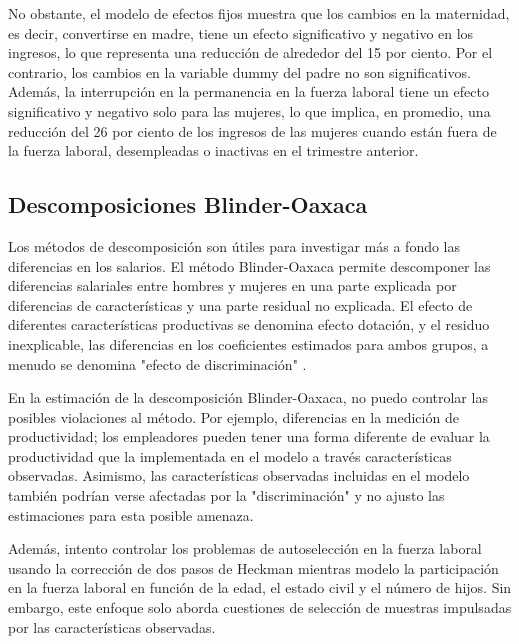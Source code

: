No obstante, el modelo de efectos fijos muestra que los cambios en la maternidad, es decir, convertirse en madre, tiene un efecto significativo y negativo en los ingresos, lo que representa una reducción de alrededor del 15 por ciento. Por el contrario, los cambios en la variable dummy del padre no son significativos. Además, la interrupción en la permanencia en la fuerza laboral tiene un efecto significativo y negativo solo para las mujeres, lo que implica, en promedio, una reducción del 26 por ciento de los ingresos de las mujeres cuando están fuera de la fuerza laboral, desempleadas o inactivas en el trimestre anterior.
\subsection{Descomposiciones Blinder-Oaxaca}
Los métodos de descomposición son útiles para investigar más a fondo las diferencias en los salarios. El método Blinder-Oaxaca permite descomponer las diferencias salariales entre hombres y mujeres en una parte explicada por diferencias de características y una parte residual no explicada. El efecto de diferentes características productivas se denomina efecto dotación, y el residuo inexplicable, las diferencias en los coeficientes estimados para ambos grupos, a menudo se denomina "efecto de discriminación" \citep{Weichselbaumer2005}.

En la estimación de la descomposición Blinder-Oaxaca, no puedo controlar las posibles violaciones al método. Por ejemplo, diferencias en la medición de productividad; los empleadores pueden tener una forma diferente de evaluar la productividad que la implementada en el modelo a través características observadas. Asimismo, las características observadas incluidas en el modelo también podrían verse afectadas por la "discriminación" y no ajusto las estimaciones para esta posible amenaza.

Además, intento controlar los problemas de autoselección en la fuerza laboral usando la corrección de dos pasos de Heckman mientras modelo la participación en la fuerza laboral en función de la edad, el estado civil y el número de hijos. Sin embargo, este enfoque solo aborda cuestiones de selección de muestras impulsadas por las características observadas.

